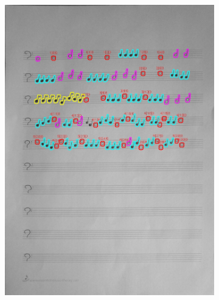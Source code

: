 \documentclass[11pt]{article}
\begin{document}
\begin{figure}[H]
\begin{subfigure}{.5\textwidth}
        \includegraphics[width=\linewidth]{8_cnts.jpg}
        \label{fig:sub2}
    \end{subfigure}
    \label{fig:test}
\end{figure}
\end{document}
